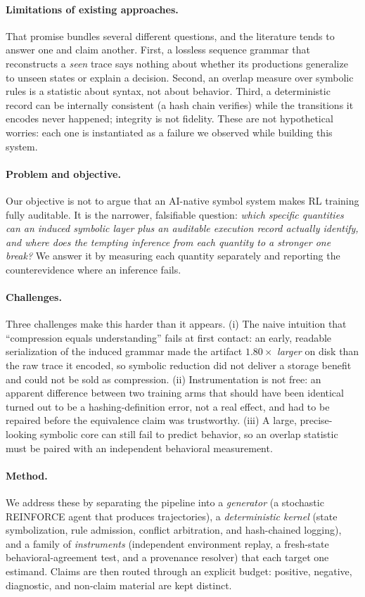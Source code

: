 \documentclass[11pt]{article}
\begin{document}
\paragraph{Limitations of existing approaches.}
That promise bundles several different questions, and the literature tends to answer one and
claim another. First, a lossless sequence grammar that reconstructs a \emph{seen} trace says
nothing about whether its productions generalize to unseen states or explain a decision.
Second, an overlap measure over symbolic rules is a statistic about syntax, not about behavior.
Third, a deterministic record can be internally consistent (a hash chain verifies) while the
transitions it encodes never happened; integrity is not fidelity. These are not hypothetical
worries: each one is instantiated as a failure we observed while building this system.

\paragraph{Problem and objective.}
Our objective is not to argue that an AI-native symbol system makes RL training fully
auditable. It is the narrower, falsifiable question: \emph{which specific quantities can an
induced symbolic layer plus an auditable execution record actually identify, and where does the
tempting inference from each quantity to a stronger one break?} We answer it by measuring each
quantity separately and reporting the counterevidence where an inference fails.

\paragraph{Challenges.}
Three challenges make this harder than it appears. (i) The naive intuition that ``compression
equals understanding'' fails at first contact: an early, readable serialization of the induced
grammar made the artifact $1.80\times$ \emph{larger} on disk than the raw trace it encoded, so
symbolic reduction did not deliver a storage benefit and could not be sold as compression.
(ii) Instrumentation is not free: an apparent difference between two training arms that should
have been identical turned out to be a hashing-definition error, not a real effect, and had to
be repaired before the equivalence claim was trustworthy. (iii) A large, precise-looking symbolic
core can still fail to predict behavior, so an overlap statistic must be paired with an
independent behavioral measurement.

\paragraph{Method.}
We address these by separating the pipeline into a \emph{generator} (a stochastic REINFORCE
agent that produces trajectories), a \emph{deterministic kernel} (state symbolization, rule
admission, conflict arbitration, and hash-chained logging), and a family of \emph{instruments}
(independent environment replay, a fresh-state behavioral-agreement test, and a provenance
resolver) that each target one estimand. Claims are then routed through an explicit budget:
positive, negative, diagnostic, and non-claim material are kept distinct.
\end{document}
